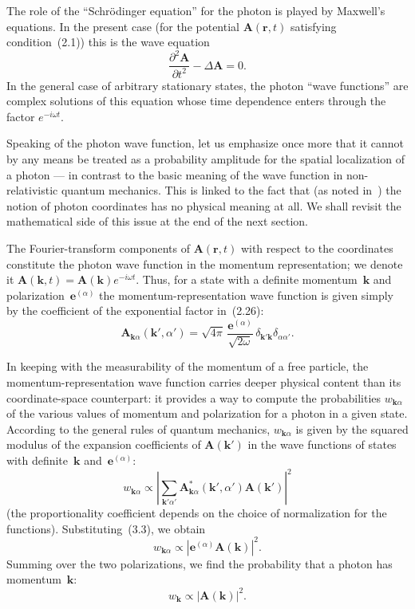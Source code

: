 The role of the ``Schr\"odinger equation'' for the photon is played by Maxwell's equations. In the present case (for the potential $\mathbf{A}(\mathbf{r},t)$ satisfying condition~(2.1)) this is the wave equation
\[
\frac{\partial^2 \mathbf{A}}{\partial t^2} - \Delta\mathbf{A} = 0.
\]
In the general case of arbitrary stationary states, the photon ``wave functions'' are complex solutions of this equation whose time dependence enters through the factor $e^{-i\omega t}$.

Speaking of the photon wave function, let us emphasize once more that it cannot by any means be treated as a probability amplitude for the
spatial localization of a photon --- in contrast to the basic meaning of the wave function in non-relativistic quantum mechanics. This is linked to the fact that (as noted in~) the notion of photon coordinates has no physical meaning at all. We shall revisit the mathematical side of this issue at the end of the next section.

The Fourier-transform components of $\mathbf{A}(\mathbf{r},t)$ with respect to the coordinates constitute the photon wave function in the momentum representation; we denote it $\mathbf{A}(\mathbf{k},t) = \mathbf{A}(\mathbf{k})e^{-i\omega t}$. Thus, for a state with a definite momentum~$\mathbf{k}$ and polarization~$\mathbf{e}^{(\alpha)}$ the momentum-representation wave function is given simply by the coefficient of the exponential factor in~(2.26):
\begin{equation}
\mathbf{A}_{\mathbf{k}\alpha}(\mathbf{k}',\alpha') = \sqrt{4\pi}\,\frac{\mathbf{e}^{(\alpha)}}{\sqrt{2\omega}}\,\delta_{\mathbf{k}'\mathbf{k}}\delta_{\alpha\alpha'}.
\tag{3.3}
\end{equation}

In keeping with the measurability of the momentum of a free particle, the momentum-representation wave function carries deeper physical content than its coordinate-space counterpart: it provides a way to compute the probabilities $w_{\mathbf{k}\alpha}$ of the various values of momentum and polarization for a photon in a given state. According to the general rules of quantum mechanics, $w_{\mathbf{k}\alpha}$ is given by the squared modulus of the expansion coefficients of $\mathbf{A}(\mathbf{k}')$ in the wave functions of states with definite~$\mathbf{k}$ and~$\mathbf{e}^{(\alpha)}$:
\[
w_{\mathbf{k}\alpha} \propto \left|\sum_{\mathbf{k}'\alpha'} \mathbf{A}^*_{\mathbf{k}\alpha}(\mathbf{k}',\alpha')\mathbf{A}(\mathbf{k}')\right|^2
\]
(the proportionality coefficient depends on the choice of normalization for the functions). Substituting~(3.3), we obtain
\begin{equation}
w_{\mathbf{k}\alpha} \propto |\mathbf{e}^{(\alpha)}\mathbf{A}(\mathbf{k})|^2.
\tag{3.4}
\end{equation}
Summing over the two polarizations, we find the probability that a photon has momentum~$\mathbf{k}$:
\begin{equation}
w_{\mathbf{k}} \propto |\mathbf{A}(\mathbf{k})|^2.
\tag{3.5}
\end{equation}

